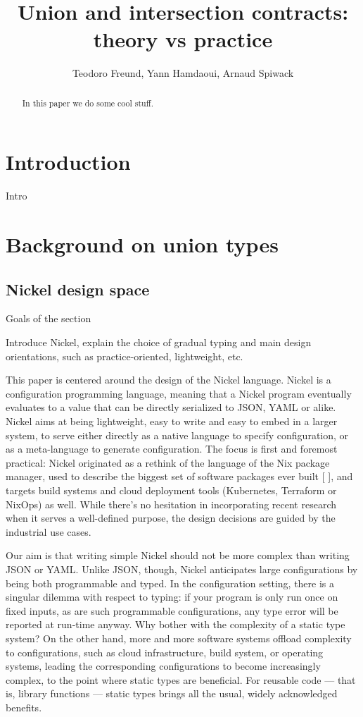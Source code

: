 \documentclass{article}
\title{Union and intersection contracts: theory vs practice}
\author{Teodoro Freund, Yann Hamdaoui, Arnaud Spiwack}
\begin{document}
\maketitle

\begin{abstract}
 In this paper we do some cool stuff.
\end{abstract}

\section*{Introduction}
Intro

\section{Background on union types}

\subsection{Nickel design space}

\color{red}Goals of the section

Introduce Nickel, explain the choice of gradual
typing and main design orientations, such as practice-oriented, lightweight,
etc.\vspace{0.5cm}\color{black}

This paper is centered around the design of the Nickel language. Nickel is a
configuration programming language, meaning that a Nickel program eventually
evaluates to a value that can be directly serialized to JSON, YAML or alike.
Nickel aims at being lightweight, easy to write and easy to embed in a larger
system, to serve either directly as a native language to specify configuration,
or as a meta-language to generate configuration. The focus is first and foremost
practical: Nickel originated as a rethink of the language of the Nix package
manager, used to describe the biggest set of software packages ever built [ ],
and targets build systems and cloud deployment tools (Kubernetes, Terraform or
NixOps) as well.  While there's no hesitation in incorporating recent research
when it serves a well-defined purpose, the design decisions are guided by the
industrial use cases. 

Our aim is that writing simple Nickel should not be more complex than writing
JSON or YAML. Unlike JSON, though, Nickel anticipates large configurations by
being both programmable and typed. In the configuration setting, there is a
singular dilemma with respect to typing: if your program is only run once on
fixed inputs, as are such programmable configurations, any type error will be
reported at run-time anyway. Why bother with the complexity of a static type
system? On the other hand, more and more software systems offload complexity to
configurations, such as cloud infrastructure, build system, or operating
systems, leading the corresponding configurations to become increasingly
complex, to the point where static types are beneficial. For reusable code —
that is, library functions — static types brings all the usual, widely
acknowledged benefits.
\end{document}
